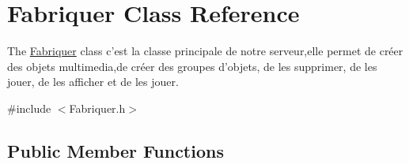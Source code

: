 \hypertarget{class_fabriquer}{\section{Fabriquer Class Reference}
\label{class_fabriquer}
}


The \hyperlink{class_fabriquer}{Fabriquer} class c'est la classe principale de notre serveur,elle permet de créer des objets multimedia,de créer des groupes d'objets, de les supprimer, de les jouer, de les afficher et de les jouer.  




{\ttfamily \#include $<$Fabriquer.\+h$>$}

\subsection*{Public Member Functions}
